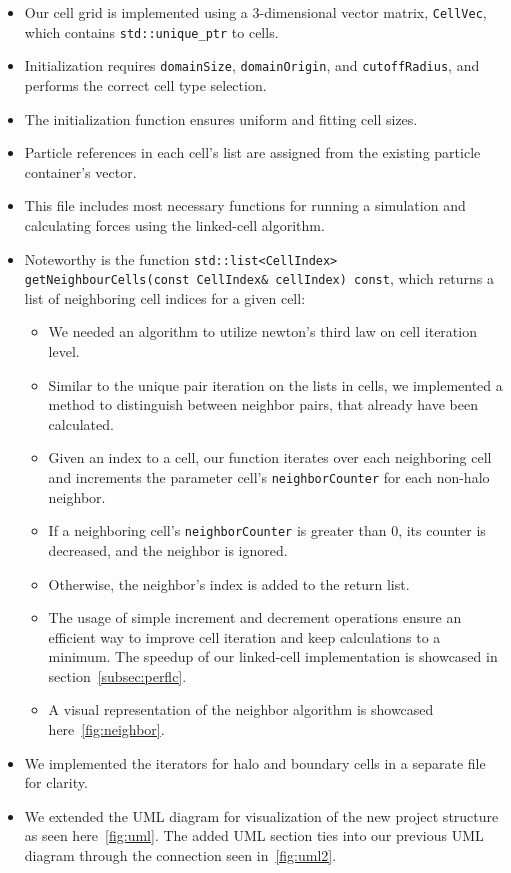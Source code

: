 \documentclass{article}
\begin{document}
\begin{itemize}
    \item Our cell grid is implemented using a 3-dimensional vector matrix, \texttt{CellVec}, which contains \texttt{std::unique\_ptr} to cells.
    \item Initialization requires \texttt{domainSize}, \texttt{domainOrigin}, and \texttt{cutoffRadius}, and performs the correct cell type selection.
    \item The initialization function ensures uniform and fitting cell sizes.
    \item Particle references in each cell's list are assigned from the existing particle container's vector.
    \item This file includes most necessary functions for running a simulation and calculating forces using the linked-cell algorithm.
    \item Noteworthy is the function \texttt{std::list<CellIndex> getNeighbourCells(const CellIndex\& cellIndex) const}, which returns a list of neighboring cell indices for a given cell:
    \begin{itemize}
        \item We needed an algorithm to utilize newton's third law on cell iteration level.
        \item Similar to the unique pair iteration on the lists in cells, we implemented a method to distinguish between neighbor pairs, that already have been calculated.
        \item Given an index to a cell, our function iterates over each neighboring cell and increments the parameter cell's \texttt{neighborCounter} for each non-halo neighbor.
        \item If a neighboring cell's \texttt{neighborCounter} is greater than 0, its counter is decreased, and the neighbor is ignored.
        \item Otherwise, the neighbor's index is added to the return list.
        \item The usage of simple increment and decrement operations ensure an efficient way to improve cell iteration and keep calculations to a minimum. The speedup of our linked-cell implementation is showcased in section\ \ref{subsec:perflc}.
        \item A visual representation of the neighbor algorithm is showcased here\ \ref{fig:neighbor}.
    \end{itemize}
    \item We implemented the iterators for halo and boundary cells in a separate file for clarity.
    \item We extended the UML diagram for visualization of the new project structure as seen here\ \ref{fig:uml}. The added UML section ties into our previous UML diagram through the connection seen in\ \ref{fig:uml2}.
\end{itemize}
\end{document}
